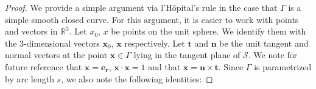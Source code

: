 \begin{proof}
%
%


We provide a simple argument via l'H\^{o}pital's rule in the case that
$\Gamma$ is a simple smooth closed curve. For this argument, it is
easier  to work with points and vectors in $\mathbb{R}^3$.  Let $x_0$,
$x$ be points on the unit sphere. We identify them with the
3-dimensional vectors $\mathbf{x}_{0}$, $\mathbf{x}$ respectively.  Let
$\mathbf{t}$ and $\mathbf{n}$ be the unit tangent and normal vectors
at the point $\mathbf{x} \in \Gamma$ lying in the tangent plane of
$\mathcal{S}$.  We note for future reference that
$\mathbf{x}=\mathbf{e_r}$, $\mathbf{x} \cdot \mathbf{x} = 1$ and that
$\mathbf{x} = \mathbf{n} \times \mathbf{t}$. Since $\Gamma$ is
parametrized by arc length $s$, we also note the following identities:


\end{proof}
